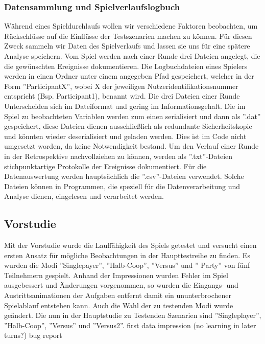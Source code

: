 \subsubsection{Datensammlung und Spielverlaufslogbuch}
Während eines Spieldurchlaufs wollen wir verschiedene Faktoren beobachten, um Rückschlüsse auf die Einflüsse der Testszenarien  machen zu können. Für diesen Zweck sammeln wir  Daten des Spielverlaufs und lassen sie uns für eine spätere Analyse speichern. Vom Spiel werden nach einer Runde drei Dateien angelegt, die die gewünschten Ereignisse dokumentieren. Die Logbuchdateien eines Spielers werden in einen Ordner unter einem angegeben Pfad gespeichert, welcher in der Form ''ParticipantX'', wobei X der jeweiligen Nutzeridentifikationsnummer entspricht (Bsp. Participant1), benannt wird. Die drei Dateien einer Runde Unterscheiden sich im Dateiformat und gering  im Informationsgehalt. Die im Spiel zu beobachteten Variablen werden zum einen serialisiert und dann als ''.dat'' gespeichert, diese Dateien dienen ausschließlich als redundante Sicherheitskopie und könnten wieder deserialisiert und  geladen werden. Dies ist im Code nicht umgesetzt worden, da keine Notwendigkeit bestand.\newline
Um den Verlauf einer Runde in der Retrospektive nachvollziehen zu können, werden als ''.txt''-Dateien stichpunktartige Protokolle der Ereignisse dokumentiert.\newline
Für die Datenauswertung  werden hauptsächlich die ''.csv''-Dateien verwendet. Solche Dateien können in Programmen, die speziell für die Datenverarbeitung  und Analyse dienen, eingelesen und verarbeitet werden.
\subsection{Vorstudie}
Mit der Vorstudie wurde die Lauffähigkeit des Spiels getestet und versucht einen ersten Ansatz für mögliche Beobachtungen in der Haupttestreihe zu finden. Es wurden die Modi ''Singlepayer'', ''Halb-Coop'', ''Versus'' und '' Party'' von fünf Teilnehmern gespielt. Anhand der Impressionen wurden Fehler im Spiel ausgebessert und Änderungen vorgenommen, so wurden die Eingangs- und Austrittsanimationen der Aufgaben entfernt damit ein ununterbrochener Spielablauf entstehen kann. Auch die Wahl der zu testenden Modi wurde geändert. Die nun in der Hauptstudie zu Testenden Szenarien sind  ''Singleplayer'', ''Halb-Coop'', ''Versus'' und ''Versus2''.
\newline
first data impression (no learning in later turns?)
bug report
